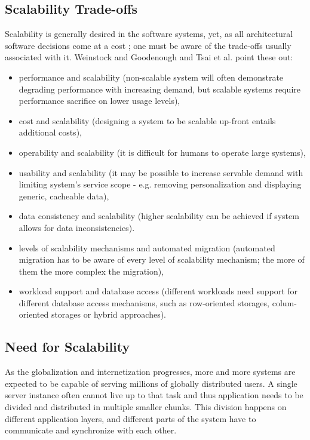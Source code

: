 \documentclass{uvamscse}
\begin{document}
\subsection{Scalability Trade-offs}
Scalability is generally desired in the software systems, yet, as all architectural software decisions come at a cost \cite{GerHeiBench}; one must be aware of the trade-offs usually associated with it. Weinstock and Goodenough \cite{WeinstockOnSystem2006} and Tsai et al. \cite{WeiTek} point these out:
\begin{itemize}
  \item performance and scalability (non-scalable system will often demonstrate degrading performance with increasing demand, but scalable systems require performance sacrifice on lower usage levels),
  \item cost and scalability (designing a system to be scalable up-front entails additional costs),
  \item operability and scalability (it is difficult for humans to operate large systems),
  \item usability and scalability (it may be possible to increase servable demand with limiting system's service scope - e.g. removing personalization and displaying generic, cacheable data),
  \item data consistency and scalability (higher scalability can be achieved if system allows for data inconsistencies).
  \item levels of scalability mechanisms and automated migration (automated migration has to be aware of every level of scalability mechanism; the more of them the more complex the migration),
  \item workload support and database access (different workloads need support for different database access mechanisms, such as row-oriented storages, colum-oriented storages or hybrid approaches).
\end{itemize}

\subsection{Need for Scalability}

As the globalization and internetization progresses, more and more systems are expected to be capable of serving millions of globally distributed users. A single server instance often cannot live up to that task and thus application needs to be divided and distributed in multiple smaller chunks. This division happens on different application layers, and different parts of the system have to communicate and synchronize with each other.
\end{document}
